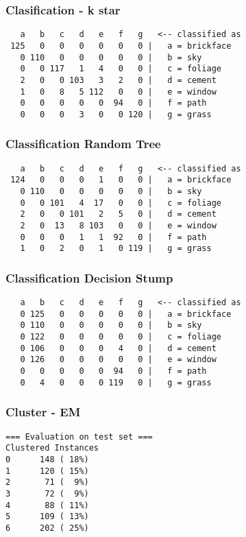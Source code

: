 \documentclass[a4paper]{article}
\begin{document}
\subsubsection{Clasification - k star}
\begin{verbatim}
   a   b   c   d   e   f   g   <-- classified as
 125   0   0   0   0   0   0 |   a = brickface
   0 110   0   0   0   0   0 |   b = sky
   0   0 117   1   4   0   0 |   c = foliage
   2   0   0 103   3   2   0 |   d = cement
   1   0   8   5 112   0   0 |   e = window
   0   0   0   0   0  94   0 |   f = path
   0   0   0   3   0   0 120 |   g = grass

\end{verbatim}


\subsubsection{Classification Random Tree}
\begin{verbatim}
   a   b   c   d   e   f   g   <-- classified as
 124   0   0   0   1   0   0 |   a = brickface
   0 110   0   0   0   0   0 |   b = sky
   0   0 101   4  17   0   0 |   c = foliage
   2   0   0 101   2   5   0 |   d = cement
   2   0  13   8 103   0   0 |   e = window
   0   0   0   1   1  92   0 |   f = path
   1   0   2   0   1   0 119 |   g = grass

\end{verbatim}
\subsubsection{Classification Decision Stump}
\begin{verbatim}
   a   b   c   d   e   f   g   <-- classified as
   0 125   0   0   0   0   0 |   a = brickface
   0 110   0   0   0   0   0 |   b = sky
   0 122   0   0   0   0   0 |   c = foliage
   0 106   0   0   0   4   0 |   d = cement
   0 126   0   0   0   0   0 |   e = window
   0   0   0   0   0  94   0 |   f = path
   0   4   0   0   0 119   0 |   g = grass

\end{verbatim}
\subsubsection{Cluster - EM}
\begin{verbatim}
=== Evaluation on test set ===
Clustered Instances
0      148 ( 18%)
1      120 ( 15%)
2       71 (  9%)
3       72 (  9%)
4       88 ( 11%)
5      109 ( 13%)
6      202 ( 25%)

\end{verbatim}
\end{document}
